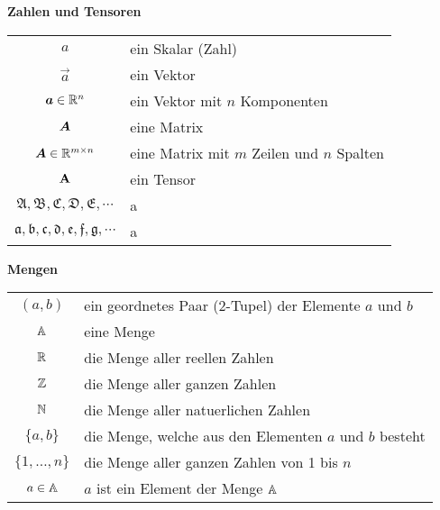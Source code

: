 \begin{center}\textbf{Zahlen und Tensoren}\end{center}
\begin{tabular}{cl}
  $a$ & ein Skalar (Zahl) \\
  $\vec{a}$ & ein Vektor \\
  $\bm{a} \in \mathbb{R}^{n}$ & ein Vektor mit $n$ Komponenten \\
  $\bm{A}$ & eine Matrix \\
  $\bm{A} \in \mathbb{R}^{m \times n}$ & eine Matrix mit $m$ Zeilen und $n$ Spalten \\
  $\mathbf{A}$ & ein Tensor \\
  $\mathfrak{A,B,C,D,E,\cdots}$ & a \\
  $\mathfrak{a,b,c,d,e,f,g,\cdots}$ & a \\


\end{tabular}

\begin{center}\textbf{Mengen}\end{center}
\begin{tabular}{cl}
  $(a,b)$ & ein geordnetes Paar (2-Tupel) der Elemente $a$ und $b$ \\
  $\mathbb{A}$ & eine Menge \\
  $\mathbb{R}$ & die Menge aller reellen Zahlen \\
  $\mathbb{Z}$ & die Menge aller ganzen Zahlen \\
  $\mathbb{N}$ & die Menge aller natuerlichen Zahlen \\
  $\{a,b\}$ & die Menge, welche aus den Elementen $a$ und $b$ besteht \\
  $\{1,\ldots,n\}$ & die Menge aller ganzen Zahlen von 1 bis $n$ \\
  $a \in \mathbb{A}$ & $a$ ist ein Element der Menge $\mathbb{A}$ \\

\end{tabular}

